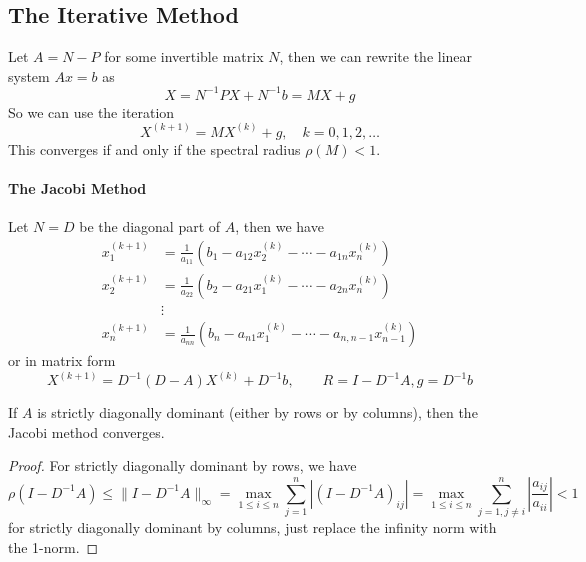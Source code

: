 \documentclass{matharticle}
\begin{document}
\subsection{The Iterative Method}
Let $A = N - P$ for some invertible matrix $N$, then we can rewrite the linear system $Ax = b$ as
\begin{equation}
	X = N^{-1} P X + N^{-1} b = M X + g
\end{equation}
So we can use the iteration
\begin{equation}
	X^{(k+1)} = M X^{(k)} + g, \quad k = 0, 1, 2, \ldots
\end{equation}
This converges if and only if the spectral radius $\rho(M) < 1$.

\paragraph{The Jacobi Method}
Let $N = D$ be the diagonal part of $A$, then we have
\begin{equation}
	\begin{aligned}
		x_1^{(k+1)} & = \frac{1}{a_{11}} \left( b_1 - a_{12} x_2^{(k)} - \cdots - a_{1n} x_n^{(k)} \right)        \\
		x_2^{(k+1)} & = \frac{1}{a_{22}} \left( b_2 - a_{21} x_1^{(k)} - \cdots - a_{2n} x_n^{(k)} \right)        \\
		            & \vdots                                                                                      \\
		x_n^{(k+1)} & = \frac{1}{a_{nn}} \left( b_n - a_{n1} x_1^{(k)} - \cdots - a_{n,n-1} x_{n-1}^{(k)} \right)
	\end{aligned}
\end{equation}
or in matrix form
\begin{equation}
	X^{(k+1)} = D^{-1} (D - A) X^{(k)} + D^{-1} b, \qquad R = I - D^{-1} A, g = D^{-1} b
\end{equation}

\begin{theorem}
	If $A$ is strictly diagonally dominant (either by rows or by columns), then the Jacobi method converges.
\end{theorem}
\begin{proof}
	For strictly diagonally dominant by rows, we have
	\begin{equation}
		\rho(I - D^{-1} A) \leq \| I - D^{-1} A \|_\infty = \max_{1 \leq i \leq n} \sum_{j=1}^{n} |(I - D^{-1} A)_{ij}| = \max_{1 \leq i \leq n} \sum_{j=1, j \neq i}^{n} |\frac{a_{ij}}{a_{ii}}| < 1
	\end{equation}
	for strictly diagonally dominant by columns, just replace the infinity norm with the 1-norm.
\end{proof}
\end{document}
